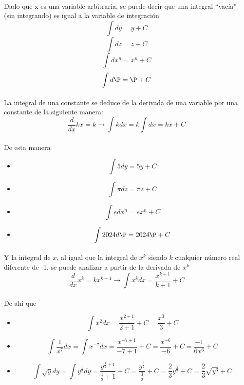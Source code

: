 \documentclass{book}
\begin{document}
            \paragraph{}Dado que x es una variable arbitraria, se puede decir que una integral “vacía” (sin integrando) es igual a la variable de integración
            $$\int{dy}=y+C$$
            $$\int{dz}=z+C$$
            $$\int{dx^n}=x^n+C$$
            $$\int{d\P}=\P+C$$
            \paragraph{}La integral de una constante se deduce de la derivada de una variable por una constante de la siguiente manera:
            \begin{equation}
            \frac{d}{dx}kx=k\rightarrow\int{k}dx=k\int{dx}=kx+C
            \end{equation}
            \paragraph{}De esta manera
            \begin{itemize}
                \item $$\int{5dy}=5y+C$$
                \item $$\int{\pi dz}=\pi z+C$$
                \item $$\int{edx^n}=ex^n+C$$
                \item $$\int{2024d\P}=2024\P+C$$
            \end{itemize}
            \paragraph{}Y la integral de $x$, al igual que la integral de $x^k$ siendo $k$ cualquier número real diferente de -1, se puede analizar a partir de la derivada de $x^k$
            \begin{equation}
            \frac{d}{dx}x^k=kx^{k-1}\rightarrow\int{x^k}dx=\frac{x^{k+1}}{k+1}+C
            \end{equation}
            \paragraph{}De ahí que
            \begin{itemize}
                \item $$\int{x^2}dx=\frac{x^{2+1}}{2+1}+C=\frac{x^3}{3}+C$$
                \item $$\int{\frac{1}{x^7}}dx=\int{x^{-7}}dx=\frac{x^{-7+1}}{-7+1}+C=\frac{x^{-6}}{-6}+C=\frac{-1}{6x^6}+C$$
                \item $$\int{\sqrt{y}}dy=\int{y^{\frac{1}{2}}}dy=\frac{y^{\frac{1}{2}+1}}{\frac{1}{2}+1}+C=\frac{y^{\frac{3}{2}}}{\frac{3}{2}}+C=\frac{2}{3}y^{\frac{3}{2}}+C=\frac{2}{3}\sqrt{y^3}+C$$
            \end{itemize}
\end{document}
